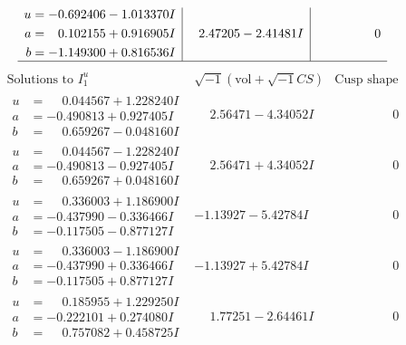 \documentclass[1p]{elsarticle_modified}
\theoremstyle{definition}
\newcommand{\I}{\sqrt{-1}}
\begin{document}
$$\begin{array}{c|c|c}
\begin{aligned}
u &= -0.692406 - 1.013370 I \\
a &= \phantom{-}0.102155 + 0.916905 I \\
b &= -1.149300 + 0.816536 I\end{aligned}
 & \phantom{-}2.47205 - 2.41481 I & \phantom{-0.000000 } 0\\
 \hline 
 \end{array}$$\newpage$$\begin{array}{c|c|c}  
\text{Solutions to }I^u_{1}& \I (\text{vol} + \sqrt{-1}CS) & \text{Cusp shape}\\
 \hline 
\begin{aligned}
u &= \phantom{-}0.044567 + 1.228240 I \\
a &= -0.490813 + 0.927405 I \\
b &= \phantom{-}0.659267 - 0.048160 I\end{aligned}
 & \phantom{-}2.56471 - 4.34052 I & \phantom{-0.000000 } 0 \\ \hline\begin{aligned}
u &= \phantom{-}0.044567 - 1.228240 I \\
a &= -0.490813 - 0.927405 I \\
b &= \phantom{-}0.659267 + 0.048160 I\end{aligned}
 & \phantom{-}2.56471 + 4.34052 I & \phantom{-0.000000 } 0 \\ \hline\begin{aligned}
u &= \phantom{-}0.336003 + 1.186900 I \\
a &= -0.437990 - 0.336466 I \\
b &= -0.117505 - 0.877127 I\end{aligned}
 & -1.13927 - 5.42784 I & \phantom{-0.000000 } 0 \\ \hline\begin{aligned}
u &= \phantom{-}0.336003 - 1.186900 I \\
a &= -0.437990 + 0.336466 I \\
b &= -0.117505 + 0.877127 I\end{aligned}
 & -1.13927 + 5.42784 I & \phantom{-0.000000 } 0 \\ \hline\begin{aligned}
u &= \phantom{-}0.185955 + 1.229250 I \\
a &= -0.222101 + 0.274080 I \\
b &= \phantom{-}0.757082 + 0.458725 I\end{aligned}
 & \phantom{-}1.77251 - 2.64461 I & \phantom{-0.000000 } 0 \\ \hline\begin{aligned}

\end{aligned}
\end{array}$$
\end{document}
